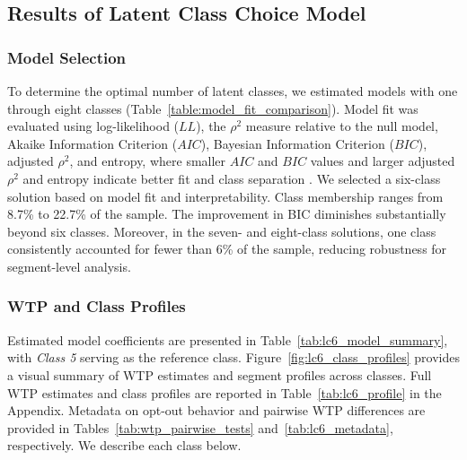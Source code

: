 \documentclass[a4paper,fleqn]{cas-sc}   %
\begin{document}
\begin{singlespace}

\end{singlespace}

\subsection{Results of Latent Class Choice Model}
\subsubsection{Model Selection}

To determine the optimal number of latent classes, we estimated models with one through eight classes (Table~\ref{table:model_fit_comparison}). Model fit was evaluated using log-likelihood ($LL$), the $\rho^2$ measure relative to the null model, Akaike Information Criterion ($AIC$), Bayesian Information Criterion ($BIC$), adjusted $\rho^2$, and entropy, where smaller $AIC$ and $BIC$ values and larger adjusted $\rho^2$ and entropy indicate better fit and class separation \parencite{nylundDecidingNumberClasses2007}. We selected a six-class solution based on model fit and interpretability. Class membership ranges from 8.7\% to 22.7\% of the sample. The improvement in BIC diminishes substantially beyond six classes. Moreover, in the seven- and eight-class solutions, one class consistently accounted for fewer than 6\% of the sample, reducing robustness for segment-level analysis. 

\begin{singlespace}

\end{singlespace}

\subsubsection{WTP and Class Profiles}

Estimated model coefficients are presented in Table~\ref{tab:lc6_model_summary}, with \textit{Class 5} serving as the reference class. Figure~\ref{fig:lc6_class_profiles} provides a visual summary of WTP estimates and segment profiles across classes. Full WTP estimates and class profiles are reported in Table~\ref{tab:lc6_profile} in the Appendix. Metadata on opt-out behavior and pairwise WTP differences are provided in Tables~\ref{tab:wtp_pairwise_tests} and~\ref{tab:lc6_metadata}, respectively.  We describe each class below.

\medskip
\end{document}
